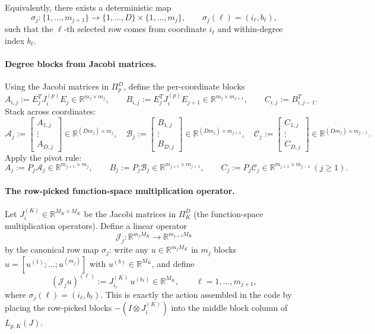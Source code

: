 \documentclass[11pt]{article}
\begin{document}
Equivalently, there exists a deterministic map
\[
\sigma_j:\{1,\dots,m_{j+1}\}\to\{1,\dots,D\}\times\{1,\dots,m_j\},
\qquad
\sigma_j(\ell)=(i_\ell,b_\ell),
\]
such that the $\ell$-th selected row comes from coordinate $i_\ell$ and within-degree index $b_\ell$.

\paragraph{Degree blocks from Jacobi matrices.}
Using the Jacobi matrices in $\Pi_p^D$, define the per-coordinate blocks
\[
A_{i,j} := E_j^T J_i^{(p)} E_j \in \mathbb{R}^{m_j\times m_j},\qquad
B_{i,j} := E_j^T J_i^{(p)} E_{j+1} \in \mathbb{R}^{m_j\times m_{j+1}},\qquad
C_{i,j} := B_{i,j-1}^T .
\]
Stack across coordinates:
\[
\mathcal A_j := \begin{bmatrix} A_{1,j}\\ \vdots\\ A_{D,j}\end{bmatrix}\in\mathbb{R}^{(D m_j)\times m_j},\quad
\mathcal B_j := \begin{bmatrix} B_{1,j}\\ \vdots\\ B_{D,j}\end{bmatrix}\in\mathbb{R}^{(D m_j)\times m_{j+1}},\quad
\mathcal C_j := \begin{bmatrix} C_{1,j}\\ \vdots\\ C_{D,j}\end{bmatrix}\in\mathbb{R}^{(D m_j)\times m_{j-1}}.
\]
Apply the pivot rule:
\[
A_j := P_j \mathcal A_j \in \mathbb{R}^{m_{j+1}\times m_j},\qquad
B_j := P_j \mathcal B_j \in \mathbb{R}^{m_{j+1}\times m_{j+1}},\qquad
C_j := P_j \mathcal C_j \in \mathbb{R}^{m_{j+1}\times m_{j-1}} \ (j\ge 1).
\]

\paragraph{The row-picked function-space multiplication operator.}
Let $J_i^{(K)}\in\mathbb{R}^{M_K\times M_K}$ be the Jacobi matrices in $\Pi_K^D$
(the function-space multiplication operators).  Define a linear operator
\[
\mathcal J_j : \mathbb{R}^{m_j M_K}\to \mathbb{R}^{m_{j+1} M_K}
\]
by the canonical row map $\sigma_j$:
write any $u\in\mathbb{R}^{m_j M_K}$ in $m_j$ blocks $u=[u^{(1)};\dots;u^{(m_j)}]$ with $u^{(b)}\in\mathbb{R}^{M_K}$,
and define
\[
(\mathcal J_j u)^{(\ell)} := J_{i_\ell}^{(K)}\, u^{(b_\ell)} \in \mathbb{R}^{M_K},
\qquad \ell=1,\dots,m_{j+1},
\]
where $\sigma_j(\ell)=(i_\ell,b_\ell)$.
This is exactly the action assembled in the code by placing the row-picked blocks $-(I\otimes J_i^{(K)})$
into the middle block column of $L_{p,K}(J)$.
\end{document}

